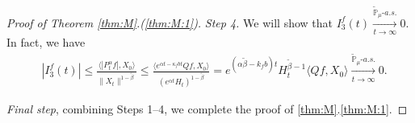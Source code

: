 \documentclass[12pt,a4paper]{amsart}
\theoremstyle{plain}
\theoremstyle{definition}
\numberwithin{equation}{section}
\begin{document}
\begin{proof}[Proof of Theorem \ref{thm:M}.(\ref{thm:M:1})]
	\emph{Step 4.} We will show that $I^f_3(t) \xrightarrow[t\to \infty]{\widetilde {\mathbb P}_\mu \text{-} a.s.} 0$.
  In fact, we have
  \begin{align}
    & |I^f_3(t)|
      \leq \frac{\langle |P^\alpha_tf|,X_0\rangle}{\|X_t\|^{1 - \tilde \beta }}
      \leq \frac{\langle e^{\alpha t - \kappa_f b t}Qf,X_0\rangle}{(e^{\alpha t} H_t)^{1 - \tilde \beta}}
      = e^{(\alpha \tilde \beta - k_fb)t} H_t^{\tilde \beta - 1} \langle Qf,X_0\rangle
      \xrightarrow[t\to \infty]{\widetilde {\mathbb P}_\mu \text{-} a.s.} 0.
  \end{align}

 	\emph{Final step}, combining Steps 1--4, we complete the proof of \ref{thm:M}.\eqref{thm:M:1}.
\end{proof}

\end{document}
